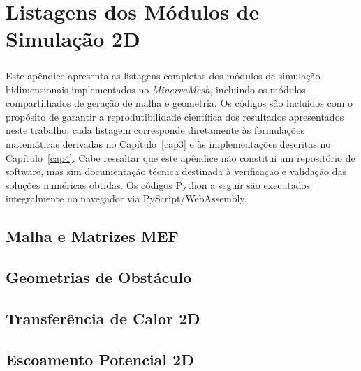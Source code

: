 \chapter{Listagens dos Módulos de Simulação 2D}
\label{ApendiceB}

\paragraph{}Este apêndice apresenta as listagens completas dos módulos de simulação bidimensionais implementados no \textit{MinervaMesh}, incluindo os módulos compartilhados de geração de malha e geometria. Os códigos são incluídos com o propósito de garantir a reprodutibilidade científica dos resultados apresentados neste trabalho: cada listagem corresponde diretamente às formulações matemáticas derivadas no Capítulo~\ref{cap3} e às implementações descritas no Capítulo~\ref{cap4}. Cabe ressaltar que este apêndice não constitui um repositório de software, mas sim documentação técnica destinada à verificação e validação das soluções numéricas obtidas. Os códigos Python a seguir são executados integralmente no navegador via PyScript/WebAssembly.

\section{Malha e Matrizes MEF}
\label{ap:common}



\section{Geometrias de Obstáculo}
\label{ap:geometry}



\section{Transferência de Calor 2D}
\label{ap:transcalor}



\section{Escoamento Potencial 2D}
\label{ap:potencial}

